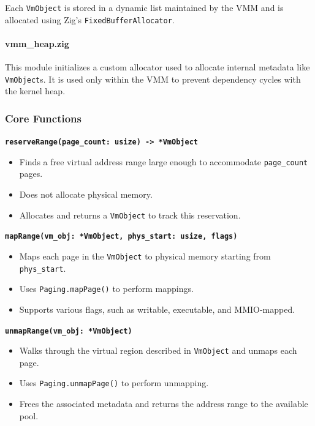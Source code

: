\documentclass[12pt]{extarticle}
\begin{document}
Each \texttt{VmObject} is stored in a dynamic list maintained by the VMM and is allocated using Zig’s \texttt{FixedBufferAllocator}.

\paragraph{vmm\_heap.zig}

This module initializes a custom allocator used to allocate internal metadata like \texttt{VmObject}s. It is used only within the VMM to prevent dependency cycles with the kernel heap.

\subsubsection*{Core Functions}

\noindent\textbf{\texttt{reserveRange(page\_count: usize) -> *VmObject}}  
\begin{itemize}
  \item Finds a free virtual address range large enough to accommodate \texttt{page\_count} pages.
  \item Does not allocate physical memory.
  \item Allocates and returns a \texttt{VmObject} to track this reservation.
\end{itemize}

\noindent\textbf{\texttt{mapRange(vm\_obj: *VmObject, phys\_start: usize, flags)}}  
\begin{itemize}
  \item Maps each page in the \texttt{VmObject} to physical memory starting from \texttt{phys\_start}.
  \item Uses \texttt{Paging.mapPage()} to perform mappings.
  \item Supports various flags, such as writable, executable, and MMIO-mapped.
\end{itemize}

\noindent\textbf{\texttt{unmapRange(vm\_obj: *VmObject)}}  
\begin{itemize}
  \item Walks through the virtual region described in \texttt{VmObject} and unmaps each page.
  \item Uses \texttt{Paging.unmapPage()} to perform unmapping.
  \item Frees the associated metadata and returns the address range to the available pool.
\end{itemize}
\end{document}
